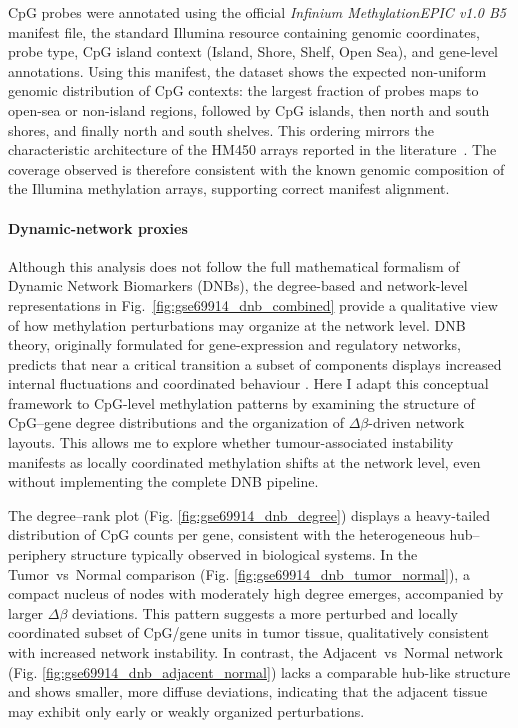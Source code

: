 \documentclass[10pt]{extarticle}
\begin{document}
CpG probes were annotated using the official \textit{Infinium MethylationEPIC v1.0 B5} \cite{illumina_manifest_epic}
manifest file, the standard Illumina resource containing genomic coordinates, probe type, 
CpG island context (Island, Shore, Shelf, Open Sea), and gene-level annotations.  
Using this manifest, the dataset shows the expected non-uniform genomic 
distribution of CpG contexts: the largest fraction of probes maps to open-sea or 
non-island regions, followed by CpG islands, then north and south shores, and finally 
north and south shelves. This ordering mirrors the characteristic architecture of the 
HM450 arrays reported in the literature~\cite{zhou2017, pidsley2016}.  
The coverage observed is therefore consistent with the known genomic 
composition of the Illumina methylation arrays, supporting correct manifest alignment.


\paragraph{Dynamic-network proxies}
\label{par:gse69914_dnb_proxies}

Although this analysis does not follow the full mathematical formalism of Dynamic Network 
Biomarkers (DNBs), the degree-based and network-level representations in 
Fig.~\ref{fig:gse69914_dnb_combined} provide a qualitative view of how methylation 
perturbations may organize at the network level.  
DNB theory, originally formulated for gene-expression and regulatory networks, predicts 
that near a critical transition a subset of components displays increased internal 
fluctuations and coordinated behaviour \cite{chen2012dnb, west2018entropy, liu2022lne}.  
Here I adapt this conceptual framework to CpG-level methylation patterns by examining the 
structure of CpG–gene degree distributions and the organization of $\Delta\beta$-driven 
network layouts. This allows me to explore whether tumour-associated instability manifests 
as locally coordinated methylation shifts at the network level, even without implementing 
the complete DNB pipeline.

The degree–rank plot (Fig. \ref{fig:gse69914_dnb_degree}) displays a heavy-tailed distribution of CpG counts per
gene, consistent with the heterogeneous hub–periphery structure typically observed in
biological systems.  
In the Tumor~vs~Normal comparison (Fig. \ref{fig:gse69914_dnb_tumor_normal}), a compact nucleus of nodes with
moderately high degree emerges, accompanied by larger $\Delta\beta$ deviations.  
This pattern suggests a more perturbed and locally coordinated subset of CpG/gene units in
tumor tissue, qualitatively consistent with increased network instability.  
In contrast, the Adjacent~vs~Normal network (Fig. \ref{fig:gse69914_dnb_adjacent_normal}) lacks a comparable hub-like
structure and shows smaller, more diffuse deviations, indicating that the adjacent tissue
may exhibit only early or weakly organized perturbations.
\end{document}
